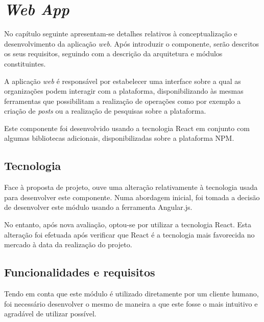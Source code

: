 \section{\textit{Web App}}

No capítulo seguinte apresentam-se detalhes relativos à conceptualização e desenvolvimento da aplicação \textit{web}. Após introduzir o componente, serão descritos os seus requisitos, seguindo com a descrição da arquitetura e módulos constituintes.

\par \medskip

A aplicação \textit{web} é responsável por estabelecer uma interface sobre a qual as organizações podem interagir com a plataforma, disponibilizando às mesmas ferramentas que possibilitam a realização de operações como por exemplo a criação de \textit{posts} ou a realização de pesquisas sobre a plataforma.

\par \medskip

Este componente foi desenvolvido usando a tecnologia React em conjunto com algumas bibliotecas adicionais, disponibilizadas sobre a plataforma NPM.

\subsection{Tecnologia}

Face à proposta de projeto, ouve uma alteração relativamente à tecnologia usada para desenvolver este componente. Numa abordagem inicial, foi tomada a decisão de desenvolver este módulo usando a ferramenta Angular.js. \par \medskip

No entanto, após nova avaliação, optou-se por utilizar a tecnologia React. Esta alteração foi efetuada após verificar que React é a tecnologia mais favorecida no mercado à data da realização do projeto. \par \medskip

\subsection{Funcionalidades e requisitos}

Tendo em conta que este módulo é utilizado diretamente por um cliente humano, foi necessário desenvolver o mesmo de maneira a que este fosse o mais intuitivo e agradável de utilizar possível. 

\par \medskip

